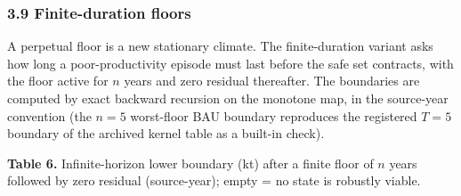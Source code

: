 \documentclass[11pt]{article}
\begin{document}
\subsubsection{3.9 Finite-duration floors}\label{budget-finite-duration-floors}

A perpetual floor is a new stationary climate. The finite-duration
variant asks how long a poor-productivity episode must last before the
safe set contracts, with the floor active for \(n\) years and zero
residual thereafter. The boundaries are computed by exact backward
recursion on the monotone map, in the source-year convention (the
\(n=5\) worst-floor BAU boundary reproduces the registered \(T=5\)
boundary of the archived kernel table as a built-in check).

\textbf{Table 6.} Infinite-horizon lower boundary (kt) after a finite
floor of \(n\) years followed by zero residual (source-year); empty = no
state is robustly viable.
\end{document}

